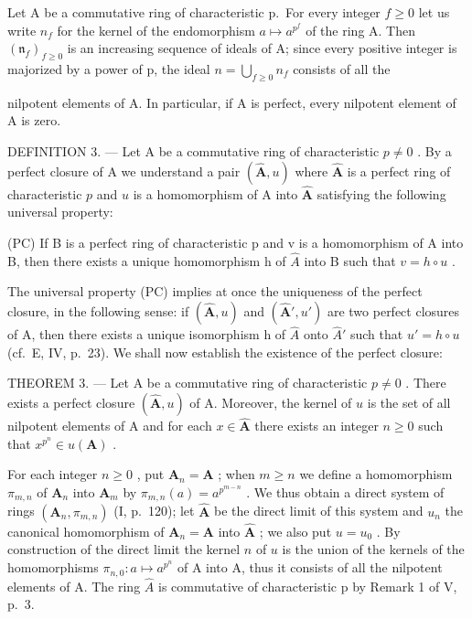 Let A be a commutative ring of characteristic p.~For every integer \(f \geqslant 0\) let us write \(n_{f}\) for the kernel of the endomorphism \(a \mapsto a^{p^{f}}\) of the ring A. Then \((\mathfrak{n}_{f})_{f \geqslant 0}\) is an increasing sequence of ideals of A; since every positive integer is majorized by a power of p, the ideal \(n = \bigcup_{f \geqslant 0} n_{f}\) consists of all the

nilpotent elements of A. In particular, if A is perfect, every nilpotent element of A is zero.

DEFINITION 3. --- Let A be a commutative ring of characteristic \(p \neq 0\) . By a perfect closure of A we understand a pair \((\hat{\mathbf{A}}, u)\) where \(\hat{\mathbf{A}}\) is a perfect ring of characteristic \(p\) and \(u\) is a homomorphism of A into \(\hat{\mathbf{A}}\) satisfying the following universal property:

(PC) If B is a perfect ring of characteristic p and v is a homomorphism of A into B, then there exists a unique homomorphism h of \(\hat{A}\) into B such that \(v = h \circ u\) .

The universal property (PC) implies at once the uniqueness of the perfect closure, in the following sense: if \((\hat{\mathbf{A}}, u)\) and \((\hat{\mathbf{A}}', u')\) are two perfect closures of A, then there exists a unique isomorphism h of \(\hat{A}\) onto \(\hat{A}'\) such that \(u' = h \circ u\) (cf.~E, IV, p.~23). We shall now establish the existence of the perfect closure:

THEOREM 3. --- Let A be a commutative ring of characteristic \(p \neq 0\) . There exists a perfect closure \((\hat{\mathbf{A}}, u)\) of A. Moreover, the kernel of \(u\) is the set of all nilpotent elements of A and for each \(x \in \hat{\mathbf{A}}\) there exists an integer \(n \geqslant 0\) such that \(x^{p^n} \in u(\mathbf{A})\) .

For each integer \(n \geqslant 0\) , put \(\mathbf{A}_n = \mathbf{A}\) ; when \(m \geqslant n\) we define a homomorphism \(\pi_{m,n}\) of \(\mathbf{A}_n\) into \(\mathbf{A}_m\) by \(\pi_{m,n}(a) = a^{p^{m-n}}\) . We thus obtain a direct system of rings \((\mathbf{A}_n, \pi_{m,n})\) (I, p.~120); let \(\hat{\mathbf{A}}\) be the direct limit of this system and \(u_n\) the canonical homomorphism of \(\mathbf{A}_n = \mathbf{A}\) into \(\hat{\mathbf{A}}\) ; we also put \(u = u_0\) . By construction of the direct limit the kernel \(n\) of \(u\) is the union of the kernels of the homomorphisms \(\pi_{n,0}: a \mapsto a^{p^n}\) of A into A, thus it consists of all the nilpotent elements of A. The ring \(\hat{A}\) is commutative of characteristic p by Remark 1 of V, p.~3.

